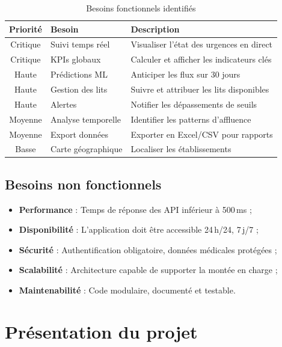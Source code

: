 \documentclass[12pt,a4paper]{report}
\begin{document}
	\begin{table}[H]
		\centering
		\caption{Besoins fonctionnels identifiés}
		\renewcommand{\arraystretch}{1.2}
		\begin{tabularx}{\textwidth}{clX}
			\toprule
			\textbf{Priorité} & \textbf{Besoin} & \textbf{Description} \\
			\midrule
			\cellcolor{rouge!20}Critique  & Suivi temps réel    & Visualiser l'état des urgences en direct \\
			\cellcolor{rouge!20}Critique  & KPIs globaux        & Calculer et afficher les indicateurs clés \\
			\cellcolor{orange!20}Haute    & Prédictions ML      & Anticiper les flux sur 30 jours \\
			\cellcolor{orange!20}Haute    & Gestion des lits    & Suivre et attribuer les lits disponibles \\
			\cellcolor{orange!20}Haute    & Alertes             & Notifier les dépassements de seuils \\
			\cellcolor{jaune!20}Moyenne   & Analyse temporelle  & Identifier les patterns d'affluence \\
			\cellcolor{jaune!20}Moyenne   & Export données      & Exporter en Excel/CSV pour rapports \\
			\cellcolor{vertOK!20}Basse    & Carte géographique  & Localiser les établissements \\
			\bottomrule
		\end{tabularx}
	\end{table}
	\newpage
	\subsection{Besoins non fonctionnels}
	
	\begin{itemize}
		\item \textbf{Performance} : Temps de réponse des API inférieur à 500\,ms ;
		\item \textbf{Disponibilité} : L'application doit être accessible 24\,h/24, 7\,j/7 ;
		\item \textbf{Sécurité} : Authentification obligatoire, données médicales protégées ;
		\item \textbf{Scalabilité} : Architecture capable de supporter la montée en charge ;
		\item \textbf{Maintenabilité} : Code modulaire, documenté et testable.
	\end{itemize}
	
	\section{Présentation du projet}
	
\end{document}

